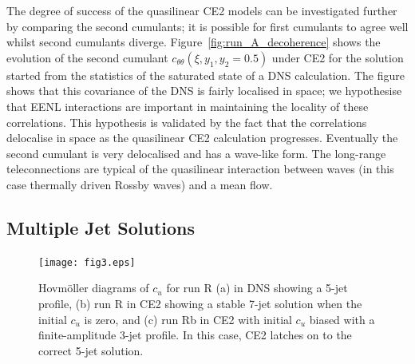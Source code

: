\documentclass{jfm}
\newcommand{\cu}{c_u}
\newcommand{\ctt}{c_{\theta \theta}}
\begin{document}
The degree of success of the quasilinear CE2 models can be investigated further by comparing the second cumulants; it is possible for first cumulants to agree well whilst second cumulants diverge. Figure~\ref{fig:run_A_decoherence} shows the evolution of the second cumulant $\ctt(\xi, y_1, y_2 = 0.5)$ under CE2 for the solution started from the statistics of the saturated state of a DNS calculation. The figure shows that this covariance of the DNS is fairly localised in space; we hypothesise that EENL interactions are important in maintaining the locality of these correlations. This hypothesis is validated by the fact that the correlations delocalise in space as the quasilinear CE2 calculation progresses. Eventually the second cumulant is very delocalised and has a wave-like form. The long-range teleconnections are typical of the quasilinear interaction between waves (in this case thermally driven Rossby waves) and a mean flow.

\subsection{Multiple Jet Solutions}
\begin{figure}
  \centering
  \texttt{[image: fig3.eps]}
  \caption{Hovm\"oller diagrams of $\cu$ for run R (a) in DNS showing a 5-jet profile, (b) run R in CE2 showing a stable 7-jet solution when the initial $\cu$ is zero, and (c) run Rb in CE2 with initial $\cu$ biased with a finite-amplitude 3-jet profile. In this case, CE2 latches on to the correct 5-jet solution.}
  \label{fig:hov_run_R}
\end{figure}
\end{document}
